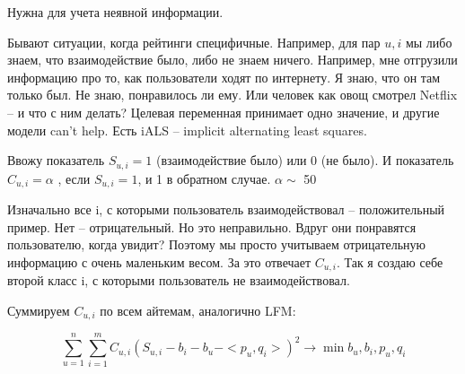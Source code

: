Нужна для учета неявной информации.

Бывают ситуации, когда рейтинги специфичные. Например, для пар $u, i$ мы либо знаем, что взаимодействие было, либо не знаем ничего. Например, мне отгрузили информацию про то, как пользователи ходят по интернету. Я знаю, что он там только был. Не знаю, понравилось ли ему. Или человек как овощ смотрел Netflix -- и что с ним делать? Целевая переменная принимает одно значение, и другие модели can't help. Есть iALS -- implicit alternating least squares. 

Ввожу показатель $S_{u,i} = 1$ (взаимодействие было) или 0 (не было). И показатель $C_{u, i}=\alpha$ , если $S_{u,i}=1$, и 1 в обратном случае. $\alpha \sim$ 50

Изначально все i, с которыми пользователь взаимодействовал -- положительный пример. Нет -- отрицательный. Но это неправильно. Вдруг они понравятся пользователю, когда увидит? Поэтому мы просто учитываем отрицательную информацию с очень маленьким весом. За это отвечает $C_{u, i}$. Так я создаю себе второй класс i, с которыми пользователь не взаимодействовал. 

Суммируем $C_{u, i}$ по всем айтемам, аналогично LFM:

\begin{equation}
    \sum^{n}_{u=1}\sum^{m}_{i=1}C_{u, i}(S_{u, i} - b_i - b_u - < p_u, q_i > )^2 \rightarrow \min b_u, b_i, p_u, q_i 
    \label{eq:18_theor}
\end{equation}
